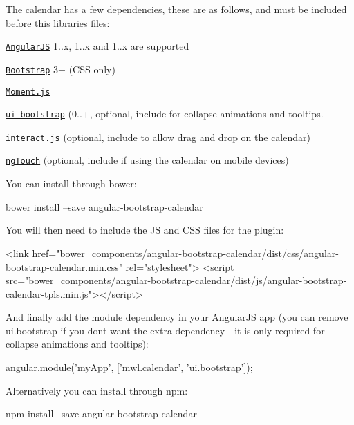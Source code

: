The calendar has a few dependencies, these are as follows, and must be included before this libraries files\+:


\begin{DoxyItemize}
\item \href{https://angularjs.org/}{\tt Angular\+JS} 1..\+x, 1..\+x and 1..\+x are supported
\item \href{http://getbootstrap.com/}{\tt Bootstrap} 3+ (C\+SS only)
\item \href{http://momentjs.com/}{\tt Moment.\+js}
\item \href{http://angular-ui.github.io/bootstrap/}{\tt ui-\/bootstrap} (0..+, optional, include for collapse animations and tooltips.
\item \href{http://interactjs.io/}{\tt interact.\+js} (optional, include to allow drag and drop on the calendar)
\item \href{https://docs.angularjs.org/api/ngTouch}{\tt ng\+Touch} (optional, include if using the calendar on mobile devices)
\end{DoxyItemize}

You can install through bower\+:


\begin{DoxyCode}
bower install --save angular-bootstrap-calendar
\end{DoxyCode}


You will then need to include the JS and C\+SS files for the plugin\+:


\begin{DoxyCode}
<link href="bower\_components/angular-bootstrap-calendar/dist/css/angular-bootstrap-calendar.min.css"
       rel="stylesheet">
<script
       src="bower\_components/angular-bootstrap-calendar/dist/js/angular-bootstrap-calendar-tpls.min.js"></script>
\end{DoxyCode}


And finally add the module dependency in your Angular\+JS app (you can remove ui.\+bootstrap if you don\textquotesingle{}t want the extra dependency -\/ it is only required for collapse animations and tooltips)\+:


\begin{DoxyCode}
angular.module('myApp', ['mwl.calendar', 'ui.bootstrap']);
\end{DoxyCode}


Alternatively you can install through npm\+: 
\begin{DoxyCode}
npm install --save angular-bootstrap-calendar
\end{DoxyCode}



